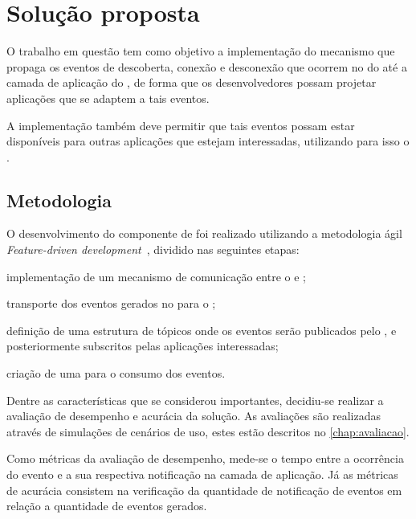 \chapter{Solução proposta}\label{chap:solucao}

O trabalho em questão tem como objetivo a implementação do mecanismo que propaga os eventos de descoberta, conexão e desconexão que ocorrem no \stwopa do \mhub até a camada de aplicação do \cddl, de forma que os desenvolvedores possam projetar aplicações que se adaptem a tais eventos.

A implementação também deve permitir que tais eventos possam estar disponíveis para outras aplicações que estejam interessadas, utilizando para isso o \mqtt.

\section{Metodologia}

O desenvolvimento do componente de \software foi realizado utilizando a metodologia ágil \textit{Feature-driven development}~\cite{coad:luca:lefebvre:1999}, dividido nas seguintes etapas:

\begin{alineas}
	\item implementação de um mecanismo de comunicação entre o \mhub e \cddl;

	\item transporte dos eventos gerados no \stwopa para o \cddl;

	\item definição de uma estrutura de tópicos onde os eventos serão publicados pelo \cddl, e posteriormente subscritos pelas aplicações interessadas;

	\item criação de uma \api para o consumo dos eventos.
\end{alineas}

Dentre as características que se considerou importantes, decidiu-se realizar a avaliação de desempenho e acurácia da solução.
As avaliações são realizadas através de simulações de cenários de uso, estes estão descritos no \autoref{chap:avaliacao}.

Como métricas da avaliação de desempenho, mede-se o tempo entre a ocorrência do evento e a sua respectiva notificação na camada de aplicação. Já as métricas de acurácia consistem na verificação da quantidade de notificação de eventos em relação a quantidade de eventos gerados.

